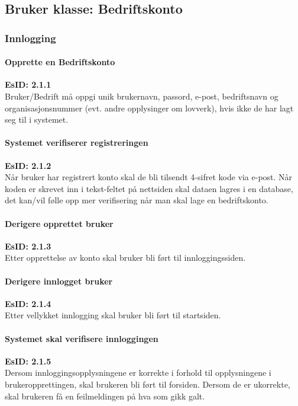 \documentclass[12pt]{article}
\begin{document}
    \subsection{Bruker klasse: Bedriftskonto}

        \subsubsection{Innlogging}
            
            \paragraph{Opprette en Bedriftskonto}
            \textbf{EsID: 2.1.1}\\Bruker/Bedrift må oppgi unik brukernavn, passord, e-post, bedriftsnavn og organisasjonsnummer (evt. andre opplysinger om lovverk), hvis ikke de har lagt seg til i systemet.

            \paragraph{Systemet verifiserer registreringen}
            \textbf{EsID: 2.1.2}\\Når bruker har registrert konto skal de bli tilsendt 4-sifret kode via e-post. Når koden er skrevet inn i tekst-feltet på nettsiden skal dataen lagres i en database, det kan/vil følle opp mer verifisering når man skal lage en bedriftskonto.

            \paragraph{Derigere opprettet bruker}
            \textbf{EsID: 2.1.3}\\Etter opprettelse av konto skal bruker bli ført til innloggingssiden.

            \paragraph{Derigere innlogget bruker}
            \textbf{EsID: 2.1.4}\\Etter vellykket innlogging skal bruker bli ført til startsiden.

            \paragraph{Systemet skal verifisere innloggingen}
            \textbf{EsID: 2.1.5}\\Dersom innloggingsopplysningene er korrekte i forhold til opplysningene i brukeropprettingen, skal brukeren bli ført til forsiden. Dersom de er ukorrekte, skal brukeren få en feilmeldingen på hva som gikk galt.
\end{document}
